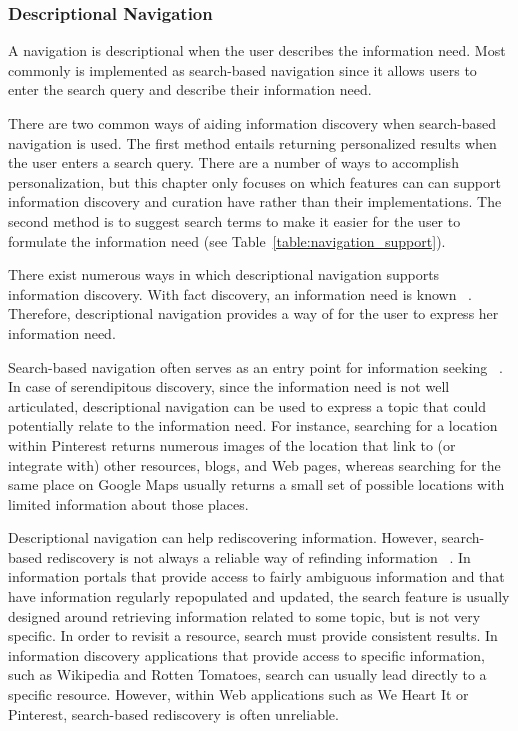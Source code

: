 {{{\subsubsection{Descriptional Navigation}
A navigation is descriptional when the user describes the information need. Most commonly is implemented as search-based navigation since it allows users to enter the search query and describe their information need.

There are two common ways of aiding information discovery when search-based navigation is used. The first method entails returning personalized results when the user enters a search query. There are a number of ways to accomplish personalization, but this chapter only focuses on which features can can support information discovery and curation have rather than their implementations. The second method is to suggest search terms to make it easier for the user to formulate the information need (see Table~\ref{table:navigation_support}). 

There exist numerous ways in which descriptional navigation supports information discovery. With fact discovery, an information need is known ~\cite{kellar2006, kellar2007}. Therefore, descriptional navigation provides a way of for the user to express her information need. 

Search-based navigation often serves as an entry point for information seeking ~\cite{levene}. In case of serendipitous discovery, since the information need is not well articulated, descriptional navigation can be used to express a topic that could potentially relate to the information need. For instance, searching for a location within Pinterest returns numerous images of the location that link to (or integrate with) other resources, blogs, and Web pages, whereas searching for the same place on Google Maps usually returns a small set of possible locations with limited information about those places.

Descriptional navigation can help rediscovering information. However, search-based rediscovery is not always a reliable way of refinding information ~\cite{cockburn}. In information portals that provide access to fairly ambiguous information and that have information regularly repopulated and updated, the search feature is usually designed around retrieving information related to some topic, but is not very specific. In order to revisit a resource, search must provide consistent results. In information discovery applications that provide access to specific information, such as Wikipedia and Rotten Tomatoes, search can usually lead directly to a specific resource. However, within Web applications such as We Heart It or Pinterest, search-based rediscovery is often unreliable.
} %

}}
